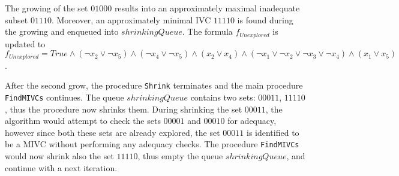 The growing of the set $01000$ results into an approximately maximal inadequate subset $01110$. Moreover, an approximately minimal IVC $11110$ is found during the growing and enqueued into $\mathit{shrinkingQueue}$. The formula $f_{\mathit{Unexplored}}$ is updated to $f_{\mathit{Unexplored}} = \mathit{True} \wedge (\neg x_2 \vee \neg x_5) \wedge	(\neg x_4 \vee \neg x_5) \wedge (x_2 \vee x_4) \wedge (\neg x_1 \vee \neg x_2 \vee \neg x_3 \vee \neg x_4) \wedge (x_1 \vee x_5)$. 

After the second grow, the procedure \texttt{Shrink} terminates and the main procedure \texttt{FindMIVCs} continues. The queue $\mathit{shrinkingQueue}$ contains two sets: $00011$, $11110$, thus the procedure now shrinks them. During shrinking the set $00011$, the algorithm would attempt to check the sets $00001$ and $00010$ for adequacy, however since both these sets are already explored, the set $00011$ is identified to be a MIVC without performing any adequacy checks. The procedure \texttt{FindMIVCs} would now shrink also the set $11110$, thus empty the queue $\mathit{shrinkingQueue}$, and continue with a next iteration. 
 
 
